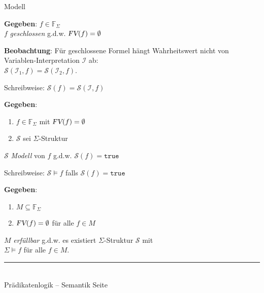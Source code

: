 \documentclass{slides}
\newcommand{\myrule}{\rule{20cm}{1mm}\\ }
\newcommand{\struct}{\mathcal{S}}
\newcommand{\FV}{\textsl{FV}}
\newcounter{mypage}
\begin{document}
\begin{slide}{}
\normalsize
\begin{center}
Modell
\end{center}
\vspace{0.5cm}

\footnotesize
\textbf{Gegeben}: $f \in \mathbb{F}_\Sigma$ \\[0.3cm]
\hspace*{1.3cm} $f$ \emph{geschlossen} \quad g.d.w. \quad $\FV(f) = \emptyset$

\textbf{Beobachtung}: Für geschlossene Formel hängt Wahrheitswert nicht von
Variablen-Interpretation $\mathcal{I}$ ab: \\[0.1cm]
\hspace*{1.3cm} $\mathcal{S}(\mathcal{I}_1, f) = \mathcal{S}(\mathcal{I}_2, f)$.

Schreibweise: $\mathcal{S}(f) = \mathcal{S}(\mathcal{I}, f)$
\vspace{0.5cm}

\textbf{Gegeben}: 
\begin{enumerate}
\item $f \in \mathbb{F}_\Sigma$ mit $\FV(f) = \emptyset$
\item $\struct$ sei $\Sigma$-Struktur 
\end{enumerate}
\quad $\struct$ \emph{Modell} von $f$ \quad g.d.w. \quad $\struct(f) = \mathtt{true}$
\vspace{0.3cm}

Schreibweise: \quad $\struct \models f$ \quad falls \quad $\struct(f) = \mathtt{true}$
\vspace{0.5cm}

\textbf{Gegeben}:  
\begin{enumerate}
\item $M \subseteq \mathbb{F}_\Sigma$
\item $\FV(f) = \emptyset$ \quad für alle $f \in M$
\end{enumerate}
$M$ \emph{erfüllbar} \quad g.d.w. \quad
es existiert $\Sigma$-Struktur $\mathcal{S}$ mit \\[0.3cm]
\hspace*{2.3cm} $\Sigma \models f$ \quad für alle $f \in M$.




\vspace*{\fill}
\tiny \addtocounter{mypage}{1}
\myrule
Prädikatenlogik -- Semantik  \hspace*{\fill} Seite 
\end{slide}
\end{document}
